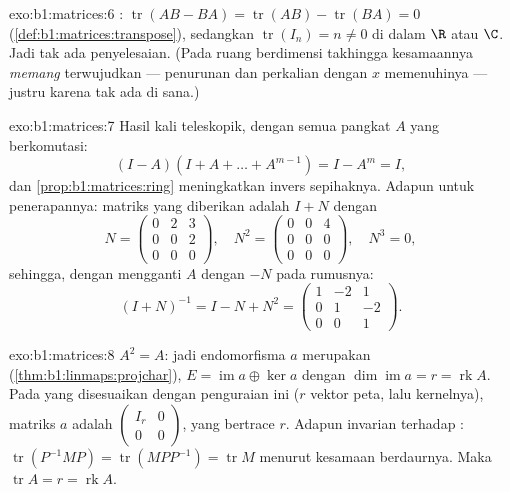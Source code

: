 \begin{solution}{exo:b1:matrices:6}
: $\operatorname{tr}(AB - BA) = \operatorname{tr}(AB) -
\operatorname{tr}(BA) = 0$ (\cref{def:b1:matrices:transpose}),
sedangkan $\operatorname{tr}(I_n) = n \neq 0$ di dalam $\R$ atau $\C$. Jadi tak ada
penyelesaian. (Pada ruang berdimensi takhingga kesamaannya \emph{memang}
terwujudkan --- penurunan dan perkalian dengan $x$ memenuhinya
--- justru karena tak ada  di sana.)
\end{solution}

\begin{solution}{exo:b1:matrices:7}
Hasil kali teleskopik, dengan semua pangkat $A$ yang berkomutasi:
\[
(I - A)(I + A + \dots + A^{m-1}) = I - A^m = I ,
\]
dan \cref{prop:b1:matrices:ring} meningkatkan invers sepihaknya. Adapun untuk
penerapannya: matriks yang diberikan adalah $I + N$ dengan
\[
N = \begin{pmatrix} 0 & 2 & 3\\ 0 & 0 & 2\\ 0&0&0 \end{pmatrix},
\quad
N^2 = \begin{pmatrix} 0&0&4\\ 0&0&0\\ 0&0&0\end{pmatrix},
\quad N^3 = 0 ,
\]
sehingga, dengan mengganti $A$ dengan $-N$ pada rumusnya:
\[
(I + N)^{-1} = I - N + N^2 =
\begin{pmatrix}
1 & -2 & 1\\
0 & 1 & -2\\
0 & 0 & 1
\end{pmatrix}.
\]
\end{solution}

\begin{solution}{exo:b1:matrices:8}
$A^2 = A$: jadi endomorfisma $a$ merupakan 
(\cref{thm:b1:linmaps:projchar}), $E = \operatorname{im} a \oplus
\ker a$ dengan $\dim\operatorname{im} a = r = \operatorname{rk} A$. Pada
 yang disesuaikan dengan penguraian ini ($r$ vektor peta,
lalu  kernelnya), matriks $a$ adalah
$\begin{pmatrix} I_r & 0\\ 0 & 0\end{pmatrix}$, yang bertrace $r$. Adapun
 invarian terhadap :
$\operatorname{tr}(P^{-1}MP) = \operatorname{tr}(MPP^{-1}) =
\operatorname{tr} M$ menurut kesamaan berdaurnya. Maka
$\operatorname{tr} A = r = \operatorname{rk} A$.
\end{solution}

